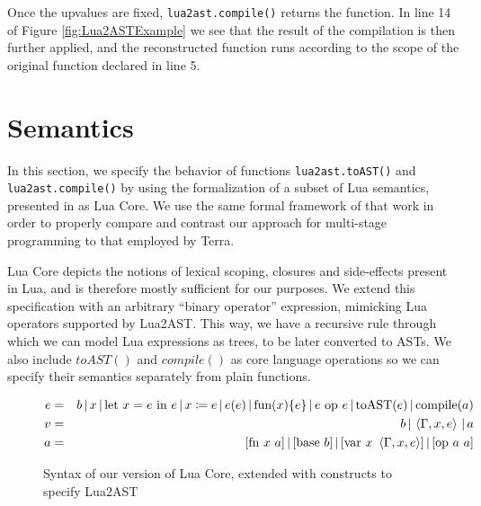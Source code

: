 \documentclass[english]{llncs}
\begin{document}
Once the upvalues are fixed, \texttt{lua2ast.compile()} returns the
function. In line 14 of Figure \ref{fig:Lua2ASTExample} we see
that the result of the compilation is then further applied,
and the reconstructed function runs according to the scope of the
original function declared in line 5.

\section{Semantics}
\label{sec:semantics}

In this section, we specify the behavior of functions \texttt{lua2ast.toAST()}
and \texttt{lua2ast.compile()} by using the formalization of a subset
of Lua semantics, presented in \cite{DeVito2013Terra} as Lua Core.
We use the same formal framework of that work in order to properly
compare and contrast our approach for multi-stage programming to that
employed by Terra.

Lua Core depicts the notions of lexical scoping, closures and side-effects
present in Lua, and is therefore mostly sufficient for our purposes.
We extend this specification with an arbitrary ``binary operator''
expression, mimicking Lua operators supported by Lua2AST. This way,
we have a recursive rule through which we can model Lua expressions
as trees, to be later converted to ASTs. We also include $toAST()$ and
$compile()$ as core language operations so we can specify their semantics
separately from plain functions.

\begin{figure}[t!]
\begin{eqnarray*}
e & = & b\,|\, x\,|\,\mbox{let \ensuremath{x=e}\ in\ \ensuremath{e}}\,|\, x\coloneqq e\,|\, e(e)\,|\,\mbox{fun}(x)\{e\}\,|\, e\mbox{ op }e\,|\,\mbox{toAST}(e)\,|\,\mbox{compile}(a)\\
v & = & b\,|\,\left\langle \Gamma,x,e\right\rangle \,|\, a\\
a & = & [\mbox{fn\ \ensuremath{x}\ \ensuremath{a}}]\,|\,[\mbox{base\ \ensuremath{b}}]\,|\,[\mbox{var}\ x\ \left\langle \Gamma,x,e\right\rangle ]\,|\,[\mbox{op\ \ensuremath{a}\ \ensuremath{a}}]
\end{eqnarray*}
\protect\caption{\label{fig:LuaCoreSyntax}Syntax of our version of Lua Core, extended
with constructs to specify Lua2AST}
\end{figure}
\end{document}
